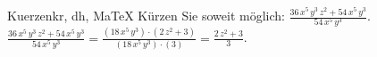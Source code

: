 \begin{MAufgabe}{Kuerzen}{kr, dh, MaTeX}
K\"urzen Sie soweit m\"oglich: $\frac{36\, x^5\, y^3\, z^2 + 54\, x^5\, y^3}{54\, x^5\, y^3}$.\\ 
\ifLsg\MLoesung
\quad $\frac{36\, x^5\, y^3\, z^2 + 54\, x^5\, y^3}{54\, x^5\, y^3}=\frac{(18\, x^5\, y^3)\cdot(2\, z^2 + 3)}{(18\, x^5\, y^3)\cdot(3)}=\frac{2\, z^2 + 3}{3}$.\else\relax\fi
 \end{MAufgabe}